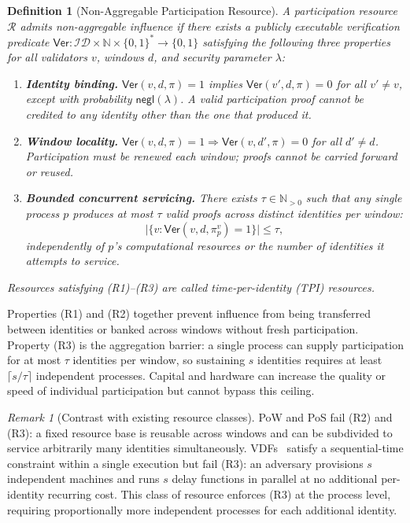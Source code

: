 \documentclass[10pt,journal,twoside]{IEEEtran}
\newtheorem{definition}[theorem]{Definition}
\theoremstyle{remark}
\newtheorem{remark}{Remark}[section]
\newcommand{\negl}{\mathsf{negl}}
\begin{document}
	\begin{definition}[Non-Aggregable Participation Resource]
		\label{def:tpi}
		A \emph{participation resource} $\mathcal{R}$ admits
		non-aggregable influence if there exists a publicly
		executable verification predicate
		$\mathsf{Ver} : \mathcal{ID} \times \mathbb{N} \times
		\{0,1\}^* \to \{0,1\}$
		satisfying the following three properties for all
		validators $v$, windows $d$, and security
		parameter $\lambda$:
		
		\begin{enumerate}
			\item[\textbf{(R1)}] \textbf{Identity binding.}
			$\mathsf{Ver}(v, d, \pi) = 1$ implies
			$\mathsf{Ver}(v', d, \pi) = 0$ for all $v' \neq v$,
			except with probability $\negl(\lambda)$.
			A valid participation proof cannot be credited to
			any identity other than the one that produced it.
			
			\item[\textbf{(R2)}] \textbf{Window locality.}
			$\mathsf{Ver}(v, d, \pi) = 1 \Rightarrow
			\mathsf{Ver}(v, d', \pi) = 0$ for all $d' \neq d$.
			Participation must be renewed each window;
			proofs cannot be carried forward or reused.
			
			\item[\textbf{(R3)}] \textbf{Bounded concurrent
				servicing.}
			There exists $\tau \in \mathbb{N}_{>0}$ such that
			any single process $p$ produces at most $\tau$
			valid proofs across distinct identities per window:
			\[
			\bigl|\{v : \mathsf{Ver}(v, d, \pi_p^v) = 1\}\bigr|
			\leq \tau,
			\]
			independently of $p$'s computational resources or
			the number of identities it attempts to service.
		\end{enumerate}
		
		Resources satisfying (R1)--(R3) are called
		\emph{time-per-identity (TPI) resources}.
	\end{definition}
	
	Properties (R1) and (R2) together prevent influence from
	being transferred between identities or banked across
	windows without fresh participation.
	Property (R3) is the aggregation barrier: a single process
	can supply participation for at most $\tau$ identities per
	window, so sustaining $s$ identities requires at least
	$\lceil s/\tau \rceil$ independent processes.
	Capital and hardware can increase the quality or speed of
	individual participation but cannot bypass this ceiling.
	
	\begin{remark}[Contrast with existing resource classes]
		\label{rem:tpi-vs-parallel}
		PoW and PoS fail (R2) and (R3): a fixed resource base
		is reusable across windows and can be subdivided to
		service arbitrarily many identities simultaneously.
		VDFs~\cite{boneh2018vdf} satisfy a sequential-time
		constraint within a single execution but fail (R3):
		an adversary provisions $s$ independent machines and
		runs $s$ delay functions in parallel at no additional
		per-identity recurring cost.
		This class of resource enforces (R3) at the process
		level, requiring proportionally more independent
		processes for each additional identity.
	\end{remark}
	
\end{document}
